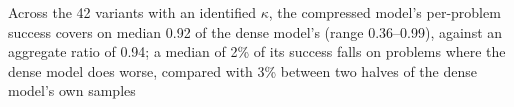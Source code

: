 Across the 42 variants with an identified $\kappa$, the compressed model's per-problem success covers on median 0.92 of the dense model's (range 0.36--0.99), against an aggregate ratio of 0.94; a median of 2\% of its success falls on problems where the dense model does worse, compared with 3\% between two halves of the dense model's own samples%
